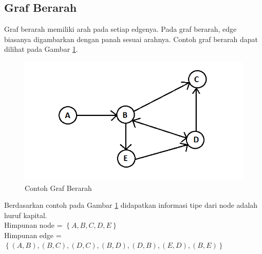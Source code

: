 \subsection{Graf Berarah}
Graf berarah memiliki arah pada setiap edgenya. Pada graf berarah, edge biasanya
digambarkan dengan panah sesuai arahnya. Contoh graf berarah dapat dilihat pada
Gambar \ref{fig:direc_graph}.
\begin{figure}[h]
\centering
\includegraphics[scale=0.72]{Gambar/direc_graph}
\caption[Contoh Graf Berarah]{Contoh Graf Berarah}
\label{fig:direc_graph}
\end{figure}
Berdasarkan contoh pada Gambar \ref{fig:direc_graph}  didapatkan informasi tipe
dari node adalah huruf kapital. \\
Himpunan node = $\left\{ A, B, C, D, E \right\}$\\ 
Himpunan edge = $\left\{ (A, B), (B, C), (D, C), (B, D), (D, B), (E, D), (B,E) \right\}$

